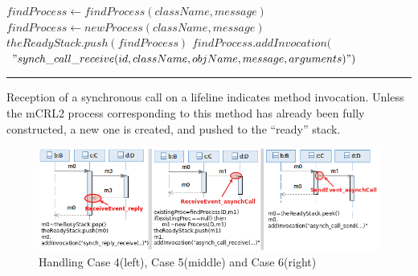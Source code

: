 \documentclass[letter]{llncs}
\newcommand{\figshrink}{\vspace{-.6cm}}
\newcommand{\figshrinkend}{}
\begin{document}
\begin{algorithmic}[1]
     
	\State $findProcess \gets findProcess(className, message)$
		  \State $findProcess \gets new Process(className, message)$
		 \EndIf
		    \State $theReadyStack.push(findProcess)$
		    \State $findProcess.addInvocation($
		     \State $"synch \_ call \_ receive(id,className,objName,message,arguments)")$
		  \EndIf
	\EndCase	
\end{algorithmic}
\hrule
\vspace{2 pt}
Reception of a synchronous call on a lifeline indicates method invocation. Unless the mCRL2 process corresponding to this method has already been
fully constructed, a new one is created, and pushed to the ``ready'' stack.
% 
\begin{figure}[!t]
\centering
\figshrink
\includegraphics[width=1.0\linewidth,keepaspectratio=true]{./aman_full.png}
\caption{Handling Case 4(left), Case 5(middle) and Case 6(right)}
\label{fig:Algo}
\figshrinkend
\end{figure}
\end{document}
